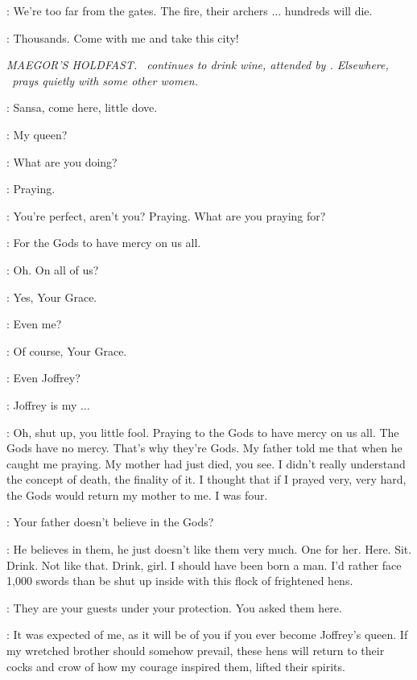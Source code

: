 \CAPTAIN: We're too far from the gates. 
The fire, their archers $\ldots$ hundreds will die. 

\STANNIS: Thousands. 
Come with me and take this city! 


\scene

\textit{MAEGOR'S HOLDFAST. \CERSEI ~continues to drink wine, attended
by \SGNS. Elsewhere, \SANSA ~prays quietly with some other women.} 

\CERSEI: Sansa, come here, little dove. 

\SANSA:  My queen?

\CERSEI: What are you doing? 

\SANSA: Praying. 

\CERSEI: You're perfect, aren't you? 
Praying. 
What are you praying for? 

\SANSA: For the Gods to have mercy on us all. 

\CERSEI: Oh. On all of us? 

\SANSA: Yes, Your Grace. 

\CERSEI: Even me? 

\SANSA: Of course, Your Grace. 

\CERSEI: Even Joffrey? 

\SANSA: Joffrey is my $\ldots$  

\CERSEI: Oh, shut up, you little fool. 
Praying to the Gods to have mercy on us all. 
The Gods have no mercy. That's why they're Gods. 
My father told me that when he caught me praying. 
My mother had just died, you see. 
I didn't really understand the concept of death, the finality of it. 
I thought that if I prayed very, very hard, the Gods would return my mother to me. I was four. 

\SANSA: Your father doesn't believe in the Gods? 

\CERSEI: He believes in them, he just doesn't like them very much. 
 One for her.  
Here. 
Sit. 
Drink. 
Not like that. Drink, girl. 
I should have been born a man. 
I'd rather face 1,000 swords than be shut up inside with this flock of frightened hens. 

\SANSA: They are your guests under your protection. 
You asked them here. 

\CERSEI: It was expected of me, as it will be of you if you ever become Joffrey's queen. 
If my wretched brother should somehow prevail, these hens will return to their cocks and crow of how my courage inspired them, lifted their spirits. 

